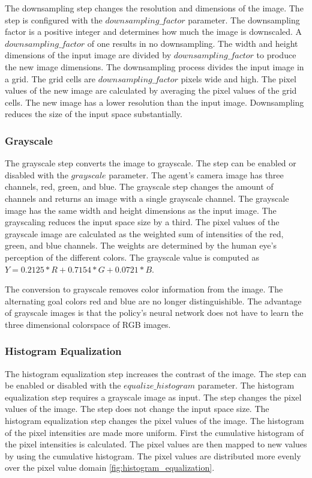 The downsampling step changes the resolution and dimensions of the image. The step is configured with the $downsampling\_factor$ parameter. The downsampling factor is a positive integer and determines how much the image is downscaled. A $downsampling\_factor$ of one results in no downsampling. The width and height dimensions of the input image are divided by $downsampling\_factor$ to produce the new image dimensions.
The downsampling process divides the input image in a grid. The grid cells are $downsampling\_factor$ pixels wide and high. The pixel values of the new image are calculated by averaging the pixel values of the grid cells. The new image has a lower resolution than the input image.
Downsampling reduces the size of the input space substantially.



\subsubsection{Grayscale}

The grayscale step converts the image to grayscale. The step can be enabled or disabled with the $grayscale$ parameter. The agent's camera image has three channels, red, green, and blue. The grayscale step changes the amount of channels and returns an image with a single grayscale channel. The grayscale image has the same width and height dimensions as the input image. The grayscaling reduces the input space size by a third.
The pixel values of the grayscale image are calculated as the weighted sum of intensities of the red, green, and blue channels. The weights are determined by the human eye's perception of the different colors. The grayscale value is computed as $Y = 0.2125 * R + 0.7154 * G + 0.0721 * B$.

The conversion to grayscale removes color information from the image. The alternating goal colors red and blue are no longer distinguishible. The advantage of grayscale images is that the policy's neural network does not have to learn the three dimensional colorspace of RGB images.



\subsubsection{Histogram Equalization}
\label{sec:histogram_equalization}

The histogram equalization step increases the contrast of the image. The step can be enabled or disabled with the $equalize\_histogram$ parameter. The histogram equalization step requires a grayscale image as input. The step changes the pixel values of the image. The step does not change the input space size.
The histogram equalization step changes the pixel values of the image. The histogram of the pixel intensities are made more uniform. First the cumulative histogram of the pixel intensities is calculated. The pixel values are then mapped to new values by using the cumulative histogram. The pixel values are distributed more evenly over the pixel value domain \ref{fig:histogram_equalization}.

